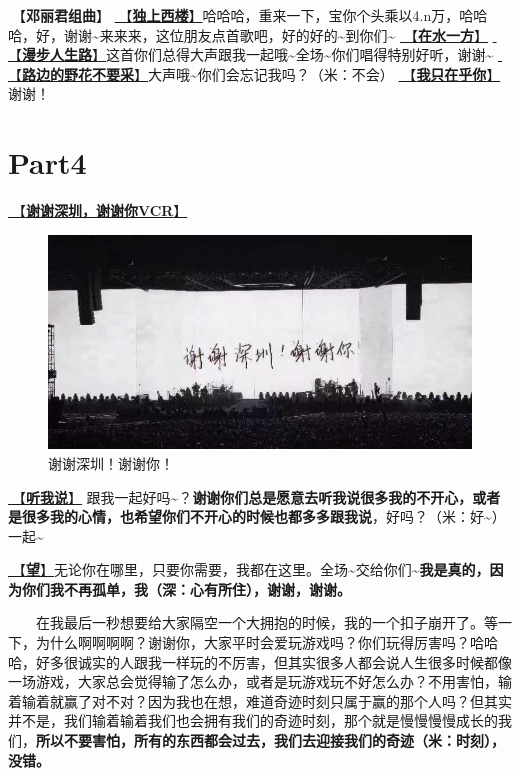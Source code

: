 \documentclass[]{ctexbook}
\begin{document}
🎵【\textbf{邓丽君组曲}】
\hyperref[one-in-the-building]{🎵【\textbf{独上西楼}】}哈哈哈，重来一下，宝你个头乘以4.n万，哈哈哈，好，谢谢\textasciitilde 来来来，这位朋友点首歌吧，好的好的\textasciitilde 到你们\textasciitilde{}
\hyperref[on-the-water-side]{🎵【\textbf{在水一方}】}
\hyperref[walk-the-road-of-life]{🎵【\textbf{漫步人生路}】}这首你们总得大声跟我一起哦\textasciitilde 全场\textasciitilde 你们唱得特别好听，谢谢\textasciitilde{}
\hyperref[only-with-me]{🎵【\textbf{路边的野花不要采}】}大声哦\textasciitilde 你们会忘记我吗？（米：不会）
\hyperref[only-you]{🎵【\textbf{我只在乎你}】}谢谢！

\section{Part4}\label{shenzhen-20240601-part4}

\hyperref[thank-you-vcr]{🎥【\textbf{谢谢深圳，谢谢你VCR}】}

\begin{figure}

{\centering \includegraphics[width=400pt]{img/shenzhen20240601/thank-shenzhen} 

}

\caption{谢谢深圳！谢谢你！}\label{fig:unnamed-chunk-44}
\end{figure}

\hyperref[listen-to-me]{🎵【\textbf{听我说}】} 跟我一起好吗\textasciitilde？\textbf{谢谢你们总是愿意去听我说很多我的不开心，或者是很多我的心情，也希望你们不开心的时候也都多多跟我说}，好吗？（米：好\textasciitilde）一起\textasciitilde{}

\hyperref[hope]{🎵【\textbf{望}】}无论你在哪里，只要你需要，我都在这里。全场\textasciitilde 交给你们\textasciitilde{}\textbf{我是真的，因为你们我不再孤单，我（深：心有所住），谢谢，谢谢。}

  在我最后一秒想要给大家隔空一个大拥抱的时候，我的一个扣子崩开了。等一下，为什么啊啊啊啊？谢谢你，大家平时会爱玩游戏吗？你们玩得厉害吗？哈哈哈，好多很诚实的人跟我一样玩的不厉害，但其实很多人都会说人生很多时候都像一场游戏，大家总会觉得输了怎么办，或者是玩游戏玩不好怎么办？不用害怕，输着输着就赢了对不对？因为我也在想，难道奇迹时刻只属于赢的那个人吗？但其实并不是，我们输着输着我们也会拥有我们的奇迹时刻，那个就是慢慢慢慢成长的我们，\textbf{所以不要害怕，所有的东西都会过去，我们去迎接我们的奇迹（米：时刻），没错。}
\end{document}
